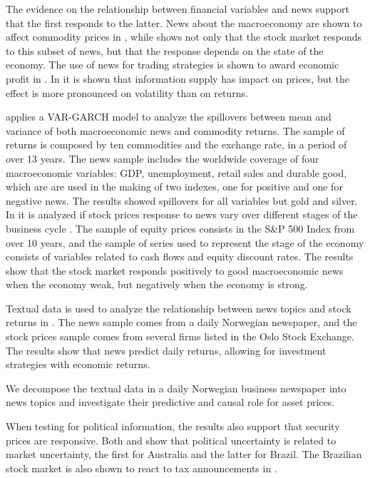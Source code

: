 \documentclass[a4paper]{article}
\begin{document}
The evidence on the relationship between financial variables and news support that the first responds to the latter. News about the macroeconomy are shown to affect commodity prices in 
\citet{caporaleetal2015}, while \citet{macqueenroley1993} shows not only that the stock market responds to this subset of news, but that the response depends on the state of the economy. The use of news for trading strategies is shown to award economic profit in \citet{larsenthorsrud2017}. In \citet{moussaetal2017} it is shown that information supply has impact on prices, but the effect is more pronounced on volatility than on returns.

\citet{caporaleetal2015} applies a VAR-GARCH model to analyze the spillovers between mean and variance of both macroeconomic news and commodity returns. The sample of returns is composed by ten commodities and the exchange rate, in a period of over 13 years. The news sample includes the worldwide coverage of four macroeconomic variables: GDP, unemployment, retail sales and durable good, which are are used in the making of two indexes, one for positive and one for negative news. The results showed spillovers for all variables but gold and silver.
In \citet{macqueenroley1993} it is analyzed if stock prices response to news vary over different stages of the business cycle . The sample of equity prices consists in the S\&P 500 Index from over 10 years, and the sample of series used to represent the stage of the economy consists of variables related to cash flows and equity discount rates. The results show that the stock market responds positively to good macroeconomic news when the economy weak, but negatively when the economy is strong. 

Textual data is used to analyze the relationship between news topics and stock returns in \citet{larsenthorsrud2017}. The news sample comes from a daily Norwegian newspaper, and the stock prices sample comes from several firms listed in the Oslo Stock Exchange. The results show that news predict daily returns, allowing for investment strategies with economic returns.



We decompose the textual data in a daily Norwegian business newspaper into news topics and investigate their predictive and causal role for asset prices.

\citet{moussaetal2017}

When testing for political information, the results also support that security prices are responsive. Both \citet{smales2015} and \citet{marquessantos2016} show that political uncertainty is related to market uncertainty, the first for Australia and the latter for Brazil. The Brazilian stock market is also shown to react to tax announcements in \cite{gabrielribeiro2013}.
\end{document}
